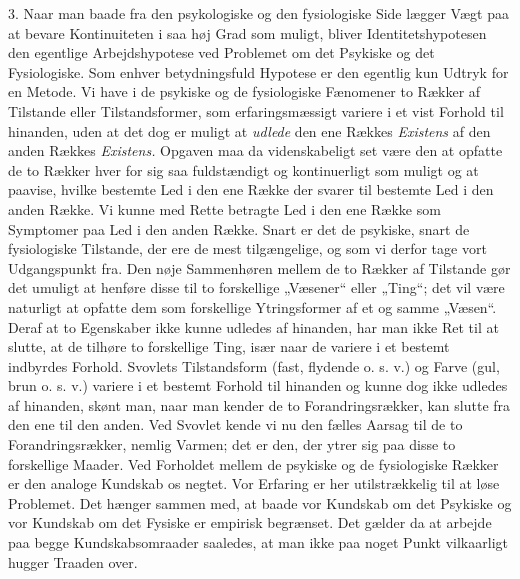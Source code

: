 \documentclass[12pt,a4paper,openany]{book}
\newcommand{\opage}[1]{\marginnote{\footnotesize\textit{[#1]}}}
\begin{document}
\opage{22}3. Naar man baade fra den psykologiske og den fysiologiske Side
lægger Vægt paa at bevare Kontinuiteten i saa høj Grad som muligt, bliver
Identitetshypotesen den egentlige Arbejdshypotese ved Problemet om det Psykiske
og det Fysiologiske. Som enhver betydningsfuld Hypotese er den egentlig kun
Udtryk for en Metode. Vi have i de psykiske og de fysiologiske Fænomener to
Rækker af Tilstande eller Tilstandsformer, som erfaringsmæssigt variere i et
vist Forhold til hinanden, uden at det dog er muligt at \textit{udlede} den ene
Rækkes \textit{Existens} af den anden Rækkes \textit{Existens.} Opgaven maa da
videnskabeligt set være den at opfatte de to Rækker hver for sig saa
fuldstændigt og kontinuerligt som muligt og at paavise, hvilke bestemte Led i
den ene Række der svarer til bestemte Led i den anden Række. Vi kunne med Rette
betragte Led i den ene Række som Symptomer paa Led i den anden Række. Snart er
det de psykiske, snart de fysiologiske Tilstande, der ere de mest tilgængelige,
og som vi derfor tage vort Udgangspunkt fra. Den nøje Sammenhøren mellem de to
Rækker af Tilstande gør det umuligt at henføre disse til to forskellige
„Væsener“ eller „Ting“; det vil være naturligt at opfatte dem som forskellige
Ytringsformer af et og samme „Væsen“. Deraf at to Egenskaber ikke kunne udledes
af hinanden, har man ikke Ret til at slutte, at de tilhøre to forskellige Ting,
især naar de variere i et bestemt indbyrdes Forhold. Svovlets Tilstandsform
(fast, flydende o. s. v.) og Farve (gul, brun o. s. v.) variere i et bestemt
Forhold til hinanden og kunne dog ikke udledes af hinanden, skønt man, naar man
kender de to Forandringsrækker, kan slutte fra den ene til den anden. Ved
Svovlet kende vi nu den fælles Aarsag til de to Forandringsrækker, nemlig
Varmen; det er den, der ytrer sig paa disse to forskellige Maader. Ved
Forholdet mellem de psykiske og de fysiologiske Rækker er den analoge Kundskab
os negtet. Vor Erfaring er her utilstrækkelig til at løse Problemet. Det hænger
sammen med, at baade vor Kundskab om det Psykiske og vor Kundskab om det
Fysiske er empirisk begrænset. Det gælder da at arbejde paa begge
Kundskabsomraader saaledes, at man ikke paa noget Punkt vilkaarligt hugger
Traaden over.
\end{document}
